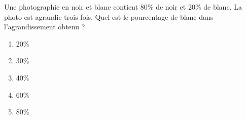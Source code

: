 Une photographie en noir et blanc contient 80\% de noir et 20\% de blanc. La photo est agrandie trois fois. Quel est le pourcentage de blanc dans l'agrandissement obtenu ?
\begin{multicols}{5}
  \begin{enumerate}[A/]
  \item 20\%
  \item 30\%
  \item 40\%
  \item 60\%
  \item 80\%
  \end{enumerate}
\end{multicols}